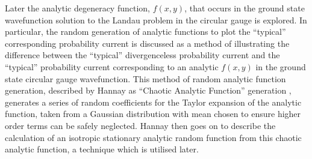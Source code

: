 Later the analytic degeneracy function, $f(x,y)$, that occurs in the ground state
wavefunction solution to the Landau problem in the circular gauge is explored.
In particular, the random generation of analytic functions to plot the
``typical'' corresponding probability current is discussed as a method of
illustrating the difference between the ``typical'' divergenceless probability
current and the ``typical'' probability current corresponding to an analytic
$f(x,y)$ in the ground state circular gauge wavefunction. This method of random
analytic function generation, described by Hannay as ``Chaotic Analytic
Function'' generation \cite{hannay}, generates a series of random coefficients
for the Taylor expansion of the analytic function, taken from a Gaussian
distribution with mean chosen to ensure higher order terms can be safely
neglected. Hannay then goes on to describe the calculation of an isotropic
stationary analytic random function from this chaotic analytic function, a
technique which is utilised later.

